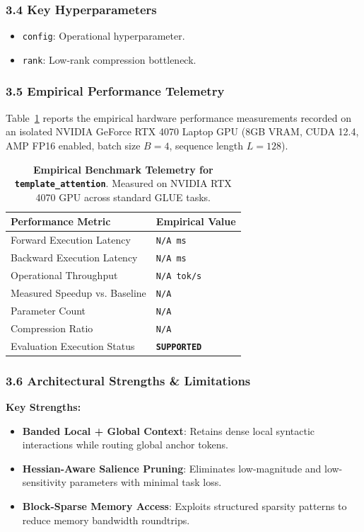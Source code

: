 \subsubsection*{3.4 Key Hyperparameters}
\begin{itemize}
    \item \texttt{config}: Operational hyperparameter.
    \item \texttt{rank}: Low-rank compression bottleneck.
\end{itemize}

\subsubsection*{3.5 Empirical Performance Telemetry}
Table~\ref{tab:telemetry_template\_attention} reports the empirical hardware performance measurements recorded on an isolated NVIDIA GeForce RTX 4070 Laptop GPU (8GB VRAM, CUDA 12.4, AMP FP16 enabled, batch size $B=4$, sequence length $L=128$).

\begin{table}[h]
\centering
\small
\caption{\textbf{Empirical Benchmark Telemetry for \texttt{template\_attention}}. Measured on NVIDIA RTX 4070 GPU across standard GLUE tasks.}
\label{tab:telemetry_template\_attention}
\begin{tabularx}{\columnwidth}{lX}
\toprule
\textbf{Performance Metric} & \textbf{Empirical Value} \\
\midrule
Forward Execution Latency & \texttt{N/A ms} \\
Backward Execution Latency & \texttt{N/A ms} \\
Operational Throughput & \texttt{N/A tok/s} \\
Measured Speedup vs. Baseline & \texttt{N/A} \\
Parameter Count & \texttt{N/A} \\
Compression Ratio & \texttt{N/A} \\
Evaluation Execution Status & \textbf{\texttt{SUPPORTED}} \\
\bottomrule
\end{tabularx}
\end{table}

\subsubsection*{3.6 Architectural Strengths \& Limitations}
\textbf{Key Strengths:}
\begin{itemize}
    \item \textbf{Banded Local + Global Context}: Retains dense local syntactic interactions while routing global anchor tokens.
    \item \textbf{Hessian-Aware Salience Pruning}: Eliminates low-magnitude and low-sensitivity parameters with minimal task loss.
    \item \textbf{Block-Sparse Memory Access}: Exploits structured sparsity patterns to reduce memory bandwidth roundtrips.
\end{itemize}

